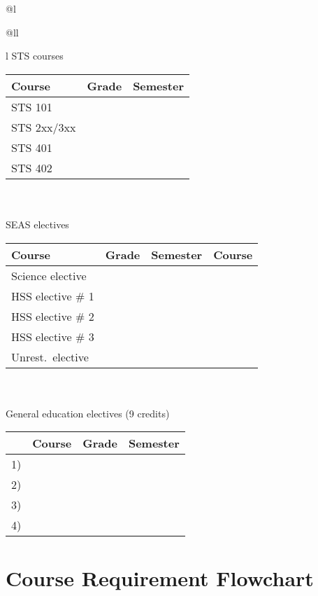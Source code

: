 \documentclass[12pt,twoside]{article}
\begin{document}
\begin{tabular}{@{}l}
\begin{tabular}{@{}ll}
\begin{tabular}{l}
\noindent STS courses
\\
\begin{tabular}{|l|l|l|} \hline
\bf Course & \bf Grade & \bf Semester \\ \hline \hline
STS 101 & & \\ \hline
STS 2xx/3xx & & \\ \hline
STS 401 & & \\ \hline
STS 402 & & \\ \hline
\end{tabular} \\
\\
\noindent SEAS electives \\
\noindent\begin{tabular}{|l|l|l|l|} \hline
\bf Course & \bf Grade & \bf Semester & \bf Course \\ \hline \hline
Science elective & & & \\ \hline
HSS elective \# 1 & & & \\ \hline
HSS elective \# 2 & & & \\ \hline
HSS elective \# 3 & & & \\ \hline
Unrest.\ elective & & & \\ \hline
\end{tabular} \\

\\
\noindent General education electives (9 credits) \\
\noindent\begin{tabular}{|l|l|l|l|} \hline
& \bf Course & \bf Grade & \bf Semester \\ \hline \hline
1) & \hspace{1in} & & \\ \hline
2) & & & \\ \hline
3) & & & \\ \hline
4) & & & \\ \hline
\end{tabular}

\end{tabular}

\end{tabular}

\end{tabular} %


\newpage
\section{Course Requirement Flowchart}
\end{document}
